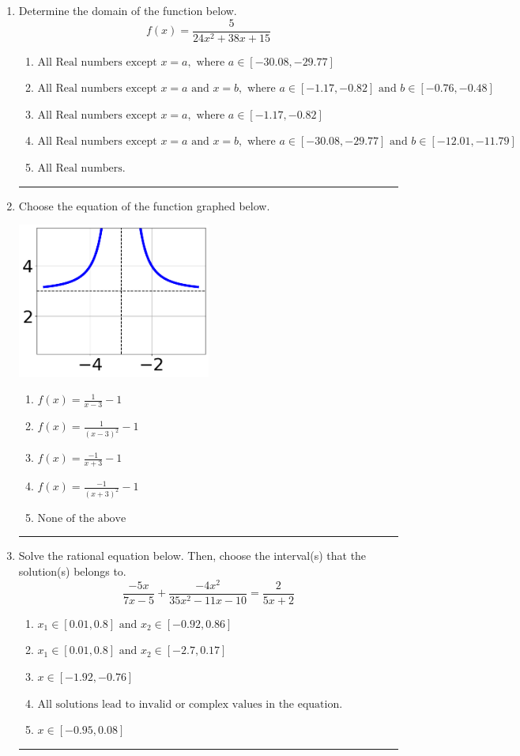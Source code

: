 \documentclass[14pt]{extbook}
\newcommand{\litem}[1]{\item#1\hspace*{-1cm}\rule{\textwidth}{0.4pt}}
\begin{document}
\begin{enumerate}
{\begin{enumerate}[label=\Alph*.]
\end{enumerate} }
\litem{
Determine the domain of the function below.\[ f(x) = \frac{5}{24x^{2} +38 x + 15} \]\begin{enumerate}[label=\Alph*.]
\item \( \text{All Real numbers except } x = a, \text{ where } a \in [-30.08, -29.77] \)
\item \( \text{All Real numbers except } x = a \text{ and } x = b, \text{ where } a \in [-1.17, -0.82] \text{ and } b \in [-0.76, -0.48] \)
\item \( \text{All Real numbers except } x = a, \text{ where } a \in [-1.17, -0.82] \)
\item \( \text{All Real numbers except } x = a \text{ and } x = b, \text{ where } a \in [-30.08, -29.77] \text{ and } b \in [-12.01, -11.79] \)
\item \( \text{All Real numbers.} \)

\end{enumerate} }
\litem{
Choose the equation of the function graphed below.
\begin{center}
    \includegraphics[width=0.5\textwidth]{../Figures/rationalGraphToEquationC.png}
\end{center}
\begin{enumerate}[label=\Alph*.]
\item \( f(x) = \frac{1}{x - 3} - 1 \)
\item \( f(x) = \frac{1}{(x - 3)^2} - 1 \)
\item \( f(x) = \frac{-1}{x + 3} - 1 \)
\item \( f(x) = \frac{-1}{(x + 3)^2} - 1 \)
\item \( \text{None of the above} \)

\end{enumerate} }
\litem{
Solve the rational equation below. Then, choose the interval(s) that the solution(s) belongs to.\[ \frac{-5x}{7x -5} + \frac{-4x^{2}}{35x^{2} -11 x -10} = \frac{2}{5x + 2} \]\begin{enumerate}[label=\Alph*.]
\item \( x_1 \in [0.01, 0.8] \text{ and } x_2 \in [-0.92,0.86] \)
\item \( x_1 \in [0.01, 0.8] \text{ and } x_2 \in [-2.7,0.17] \)
\item \( x \in [-1.92,-0.76] \)
\item \( \text{All solutions lead to invalid or complex values in the equation.} \)
\item \( x \in [-0.95,0.08] \)


\end{enumerate}}
\end{enumerate}
\end{document}
